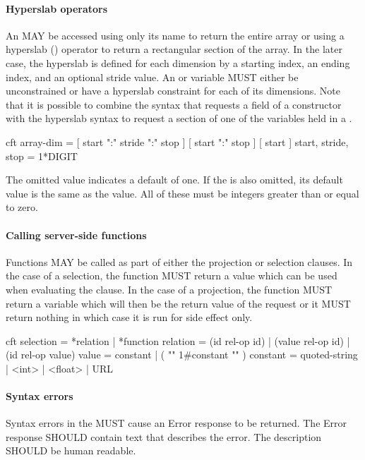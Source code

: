 \documentclass[justify]{nasa-ese}
\begin{document}
\paragraph{Hyperslab operators}
An \Array MAY be accessed using only its name to return the entire array or
using a hyperslab (\lit{[]}) operator to return a rectangular section of
the array. In the later case, the hyperslab is defined for each dimension by
a starting index, an ending index, and an optional stride value. An \Array or
\Grid variable MUST either be unconstrained or have a hyperslab constraint for
each of its dimensions. Note that it is possible to combine the syntax that
requests a field of a constructor with the \Array hyperslab syntax to request
a section of one of the \Array variables held in a \Grid.

\begin{vcode}{cft}
array-dim = [ start ":" stride ":" stop ] 
            [ start ":" stop ] 
            [ start ] 
start, stride, stop = 1*DIGIT 
\end{vcode}

The omitted  value indicates a default of one.  If the
 is also omitted, its default value is the same as the
 value.  All of these must be integers greater than or
equal to zero.

\paragraph{Calling server-side functions}
Functions MAY be called as part of either the projection or selection
clauses. In the case of a selection, the function MUST return a value which
can be used when evaluating the clause. In the case of a projection, the
function MUST return a \DAP variable which will then be the return value of
the request or it MUST return nothing in which case it is run for side effect
only. 

\begin{vcode}{cft}
selection = *relation | *function 
relation  = (id rel-op id) | (value rel-op id) 
            | (id rel-op value) 
value     = constant | ( "{" 1#constant "}" ) 
constant  = quoted-string | <int> | <float> | URL 
\end{vcode}

\paragraph{Syntax errors}
Syntax errors in the \CE MUST cause an Error response to be returned. The
Error response SHOULD contain text that describes the error. The description
SHOULD be human readable.
\end{document}
